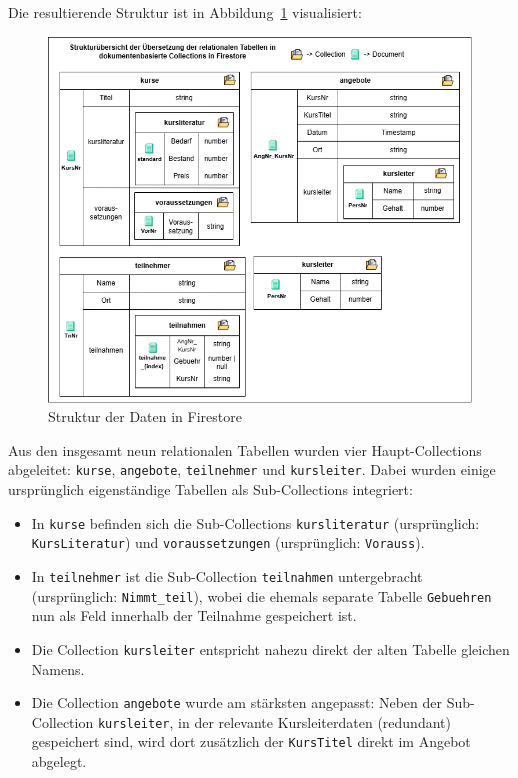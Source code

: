 \documentclass[12pt,a4paper%
              ,oneside     %
              ,titlepage
              ,DIV=13
              ,headinclude
              ,footinclude=false%
              ,cleardoublepage=empty%
              ,parskip=half,
              BCOR=0mm,
              ]{scrreprt}
\begin{document}
Die resultierende Struktur ist in Abbildung~\ref{fig:structure} visualisiert:

\begin{figure}[H]
	\centering
	\includegraphics[width=\dimexpr0.9\linewidth]{img/StrukturFirestore.png}
	\caption{Struktur der Daten in Firestore}
	\label{fig:structure}
\end{figure}

Aus den insgesamt neun relationalen Tabellen wurden vier Haupt-Collections abgeleitet: \texttt{kurse}, \texttt{angebote}, \texttt{teilnehmer} und \texttt{kursleiter}. Dabei wurden einige ursprünglich eigenständige Tabellen als Sub-Collections integriert:

\begin{itemize}
	\item In \texttt{kurse} befinden sich die Sub-Collections \texttt{kursliteratur} (ursprünglich: \texttt{KursLiteratur}) und \texttt{voraussetzungen} (ursprünglich: \texttt{Vorauss}).
	\item In \texttt{teilnehmer} ist die Sub-Collection \texttt{teilnahmen} untergebracht (ursprünglich: \texttt{Nimmt\_teil}), wobei die ehemals separate Tabelle \texttt{Gebuehren} nun als Feld innerhalb der Teilnahme gespeichert ist.
	\item Die Collection \texttt{kursleiter} entspricht nahezu direkt der alten Tabelle gleichen Namens.
	\item Die Collection \texttt{angebote} wurde am stärksten angepasst: Neben der Sub-Collection \texttt{kursleiter}, in der relevante Kursleiterdaten (redundant) gespeichert sind, wird dort zusätzlich der \texttt{KursTitel} direkt im Angebot abgelegt.
\end{itemize}
\end{document}
